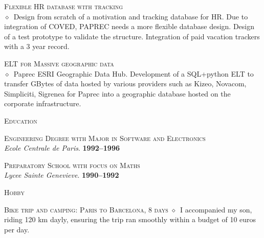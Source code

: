 \documentclass[11pt, a4paper]{article}
\newcommand{\dates}[1]{\hfill\mbox{\textbf{#1}}} %
\newcommand{\smaller}[1]{{\small$\diamond$\ #1}}
\newcommand{\headright}[1]{\vspace*{2.5ex}\textsc{\Large\color{cvblue}#1}\par%
     \vspace*{-2ex}{\color{cvblue}\hrulefill}\par}
\begin{document}
\begin{minipage}[t]{0.56\textwidth}
\textsc{Flexible HR database with tracking} \\
\smaller{Design from scratch of a motivation and tracking database for HR. Due to integration of COVED, PAPREC needs a more flexible database design. Design of a test prototype to validate the structure. Integration of paid vacation trackers with a 3 year record.}

\textsc{ELT for Massive geographic data} \\
\smaller{Paprec ESRI Geographic Data Hub. Development of a SQL+python ELT to transfer GBytes of data hosted by various providers such as Kizeo, Novacom, Simpliciti, Sigrenea for Paprec into a geographic database hosted on the corporate infrastructure.}

\headright{Education}

\textsc{Engineering Degree with Major in Software and Electronics} \\\textit{Ecole Centrale de Paris}. \dates{1992--1996}

\textsc{Preparatory School with focus on Maths} \\
\textit{Lycee Sainte Genevieve}.  \dates{1990--1992}

\headright{Hobby}

\textsc{Bike trip and camping: Paris to Barcelona, 8 days}
\smaller{I accompanied my son, riding 120 km dayly, ensuring the trip ran smoothly within a budget of 10 euros per day.}

\end{minipage}
\end{document}
